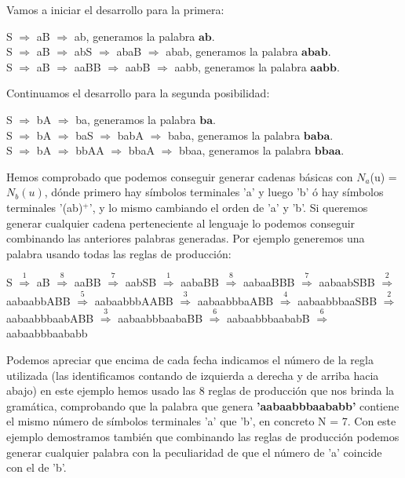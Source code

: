 Vamos a iniciar el desarrollo para la primera:
\begin{flushleft}
\qquad S $\Rightarrow$ aB $\Rightarrow$ ab, generamos la palabra $\textbf{ab}$.\\
\qquad S $\Rightarrow$ aB $\Rightarrow$ abS $\Rightarrow$ abaB $\Rightarrow$ abab, generamos la palabra $\textbf{abab}$.\\
\qquad S $\Rightarrow$ aB $\Rightarrow$ aaBB $\Rightarrow$ aabB $\Rightarrow$ aabb, generamos la palabra $\textbf{aabb}$.\\
\end{flushleft}
Continuamos el desarrollo para la segunda posibilidad:
\begin{flushleft}
\qquad S $\Rightarrow$ bA $\Rightarrow$ ba, generamos la palabra $\textbf{ba}$.\\
\qquad S $\Rightarrow$ bA $\Rightarrow$ baS $\Rightarrow$ babA $\Rightarrow$ baba, generamos la palabra $\textbf{baba}$.\\
\qquad S $\Rightarrow$ bA $\Rightarrow$ bbAA $\Rightarrow$ bbaA $\Rightarrow$ bbaa, generamos la palabra $\textbf{bbaa}$.\\
\end{flushleft}

Hemos comprobado que podemos conseguir generar cadenas básicas con $N_{a}$(u) = $N_{b}(u)$, dónde primero hay símbolos terminales 'a' y luego 'b' ó hay símbolos terminales '(ab)$^{+}$', y lo mismo cambiando el orden de 'a' y 'b'. Si queremos generar cualquier cadena perteneciente al lenguaje lo podemos conseguir combinando las anteriores palabras generadas. Por ejemplo generemos una palabra usando todas las reglas de producción:

\begin{center}
	 S $ \stackrel{1}{\Rightarrow} $ aB 
	 $\stackrel{8}{\Rightarrow}$ aaBB 
	 $\stackrel{7}{\Rightarrow}$ aabSB 
	 $\stackrel{1}{\Rightarrow}$ aabaBB  
	 $\stackrel{8}{\Rightarrow}$  aabaaBBB 
	 $\stackrel{7}{\Rightarrow}$ aabaabSBB 
	 $\stackrel{2}{\Rightarrow}$ aabaabbABB 
	 $\stackrel{5}{\Rightarrow}$  aabaabbbAABB $\stackrel{3}{\Rightarrow}$ aabaabbbaABB $\stackrel{4}{\Rightarrow}$ aabaabbbaaSBB $\stackrel{2}{\Rightarrow}$ aabaabbbaabABB $\stackrel{3}{\Rightarrow}$ aabaabbbaabaBB $\stackrel{6}{\Rightarrow}$ aabaabbbaababB $\stackrel{6}{\Rightarrow}$ aabaabbbaababb
\end{center}

Podemos apreciar que encima de cada fecha indicamos el número de la regla utilizada (las identificamos contando de izquierda a derecha y de arriba hacia abajo) en este ejemplo hemos usado las 8 reglas de producción que nos brinda la gramática, comprobando que la palabra que genera \textbf{'aabaabbbaababb'} contiene el mismo número de símbolos terminales 'a' que 'b', en concreto N = 7. Con este ejemplo demostramos también que combinando las reglas de producción podemos generar cualquier palabra con la peculiaridad de que el número de 'a' coincide con el de 'b'.

